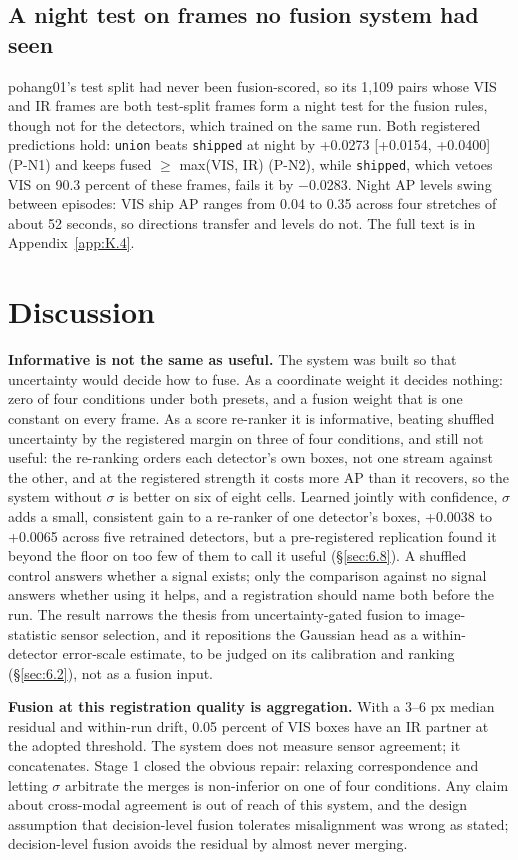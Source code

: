 \documentclass[10pt]{article}
\begin{document}
\subsection{A night test on frames no fusion system had seen}\label{sec:7.4}
pohang01's test split had never been fusion-scored, so its 1,109 pairs whose VIS and IR frames are both test-split frames form a night test for the fusion rules, though not for the detectors, which trained on the same run. Both registered predictions hold: \texttt{union} beats \texttt{shipped} at night by +0.0273 [+0.0154, +0.0400] (P-N1) and keeps fused $\geq$ max(VIS, IR) (P-N2), while \texttt{shipped}, which vetoes VIS on 90.3 percent of these frames, fails it by $-$0.0283. Night AP levels swing between episodes: VIS ship AP ranges from 0.04 to 0.35 across four stretches of about 52 seconds, so directions transfer and levels do not. The full text is in Appendix~\ref{app:K.4}.

\section{Discussion}\label{sec:8}
\textbf{Informative is not the same as useful.} The system was built so that uncertainty would decide how to fuse. As a coordinate weight it decides nothing: zero of four conditions under both presets, and a fusion weight that is one constant on every frame. As a score re-ranker it is informative, beating shuffled uncertainty by the registered margin on three of four conditions, and still not useful: the re-ranking orders each detector's own boxes, not one stream against the other, and at the registered strength it costs more AP than it recovers, so the system without $\sigma$ is better on six of eight cells. Learned jointly with confidence, $\sigma$ adds a small, consistent gain to a re-ranker of one detector's boxes, +0.0038 to +0.0065 across five retrained detectors, but a pre-registered replication found it beyond the floor on too few of them to call it useful (\S\ref{sec:6.8}). A shuffled control answers whether a signal exists; only the comparison against no signal answers whether using it helps, and a registration should name both before the run. The result narrows the thesis from uncertainty-gated fusion to image-statistic sensor selection, and it repositions the Gaussian head as a within-detector error-scale estimate, to be judged on its calibration and ranking (\S\ref{sec:6.2}), not as a fusion input.

\textbf{Fusion at this registration quality is aggregation.} With a 3--6 px median residual and within-run drift, 0.05 percent of VIS boxes have an IR partner at the adopted threshold. The system does not measure sensor agreement; it concatenates. Stage 1 closed the obvious repair: relaxing correspondence and letting $\sigma$ arbitrate the merges is non-inferior on one of four conditions. Any claim about cross-modal agreement is out of reach of this system, and the design assumption that decision-level fusion tolerates misalignment was wrong as stated; decision-level fusion avoids the residual by almost never merging.
\end{document}
